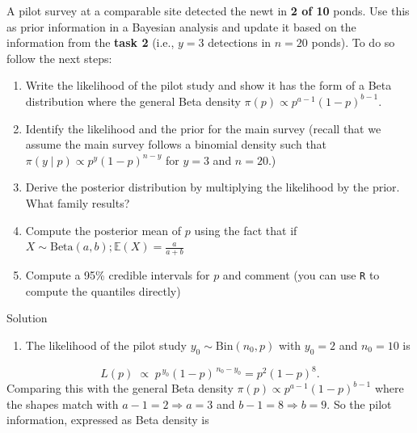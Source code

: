 \documentclass[
  letterpaper,
  DIV=11,
  numbers=noendperiod,
  oneside]{scrartcl}
\providecommand{\tightlist}{%
  \setlength{\itemsep}{0pt}\setlength{\parskip}{0pt}}\usepackage{longtable,booktabs,array}
\begin{document}
\begin{tcolorbox}[enhanced jigsaw, bottomrule=.15mm, breakable, bottomtitle=1mm, colback=white, titlerule=0mm, colbacktitle=quarto-callout-important-color!10!white, rightrule=.15mm, toptitle=1mm, left=2mm, opacityback=0, toprule=.15mm, arc=.35mm, title={Level M Extra Question}, colframe=quarto-callout-important-color-frame, coltitle=black, leftrule=.75mm, opacitybacktitle=0.6]

A pilot survey at a comparable site detected the newt in \textbf{2 of
10} ponds. Use this as prior information in a Bayesian analysis and
update it based on the information from the \textbf{task 2} (i.e.,
\(y = 3\) detections in \(n = 20\) ponds). To do so follow the next
steps:

\begin{enumerate}
\def\labelenumi{\arabic{enumi}.}
\tightlist
\item
  Write the likelihood of the pilot study and show it has the form of a
  Beta distribution where the general Beta density
  \(\pi(p) \propto p^{a-1}(1-p)^{b-1}\).
\item
  Identify the likelihood and the prior for the main survey (recall that
  we assume the main survey follows a binomial density such that
  \(\pi(y \mid p) \propto  p^{y}(1-p)^{n-y}\) for \(y=3\) and \(n=20\).)
\item
  Derive the posterior distribution by multiplying the likelihood by the
  prior. What family results?
\item
  Compute the posterior mean of \(p\) using the fact that if
  \(X\sim\text{Beta}(a,b); \mathbb{E}(X) =\frac{a}{a+b}\)
\item
  Compute a 95\% credible intervals for \(p\) and comment (you can use
  \texttt{R} to compute the quantiles directly)
\end{enumerate}

Solution

\begin{enumerate}
\def\labelenumi{\arabic{enumi}.}
\tightlist
\item
  The likelihood of the pilot study \(y_{0}\sim\text{Bin}(n_0,p)\) with
  \(y_0=2\) and \(n_0=10\) is
\end{enumerate}

\[
L(p) \;\propto\; p^{\,y_0}(1-p)^{\,n_0 - y_0} = p^{2}(1-p)^{8}.
\] Comparing this with the general Beta density
\(\pi(p) \propto p^{a-1}(1-p)^{b-1}\) where the shapes match with
\(a - 1 = 2 \Rightarrow a = 3\) and \(b - 1 = 8  \Rightarrow b = 9\). So
the pilot information, expressed as Beta density is


\end{tcolorbox}
\end{document}
